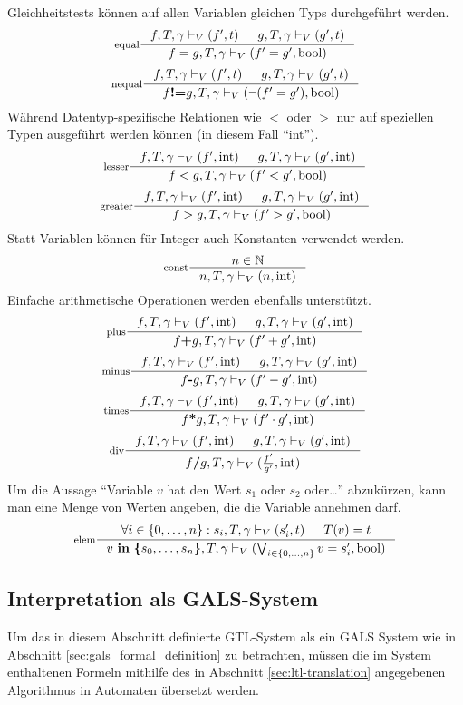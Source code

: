 Gleichheitstests können auf allen Variablen gleichen Typs durchgeführt werden.
\[
\inference[equal]{f,T,\gamma\vdash_V (f',t) & g,T,\gamma\vdash_V (g',t)}{f=g,T,\gamma\vdash_V(f'=g',\textrm{bool})}
\]
\[
\inference[nequal]{f,T,\gamma\vdash_V (f',t) & g,T,\gamma\vdash_V (g',t)}{f\textbf{!=}g,T,\gamma\vdash_V(\lnot(f'=g'),\textrm{bool})}
\]
Während Datentyp-spezifische Relationen wie $<$ oder $>$ nur auf speziellen Typen ausgeführt werden können (in diesem Fall "`int"').
\[
\inference[lesser]{f,T,\gamma\vdash_V (f',\textrm{int}) & g,T,\gamma\vdash_V (g',\textrm{int})}{f<g,T,\gamma\vdash_V(f'<g',\textrm{bool})}
\]
\[
\inference[greater]{f,T,\gamma\vdash_V (f',\textrm{int}) & g,T,\gamma\vdash_V (g',\textrm{int})}{f>g,T,\gamma\vdash_V(f'>g',\textrm{bool})}
\]
Statt Variablen können für Integer auch Konstanten verwendet werden. 
\[
\inference[const]{n\in\mathbb{N}}{n,T,\gamma\vdash_V (n,\textrm{int})}
\]
Einfache arithmetische Operationen werden ebenfalls unterstützt.
\[
\inference[plus]{f,T,\gamma\vdash_V (f',\textrm{int}) & g,T,\gamma\vdash_V (g',\textrm{int})}{f\textbf{+}g,T,\gamma\vdash_V (f'+g',\textrm{int})}
\]
\[
\inference[minus]{f,T,\gamma\vdash_V (f',\textrm{int}) & g,T,\gamma\vdash_V (g',\textrm{int})}{f\textbf{-}g,T,\gamma\vdash_V (f'-g',\textrm{int})}
\]
\[
\inference[times]{f,T,\gamma\vdash_V (f',\textrm{int}) & g,T,\gamma\vdash_V (g',\textrm{int})}{f\textbf{*}g,T,\gamma\vdash_V (f'\cdot g',\textrm{int})}
\]
\[
\inference[div]{f,T,\gamma\vdash_V (f',\textrm{int}) & g,T,\gamma\vdash_V (g',\textrm{int})}{f\textbf{/}g,T,\gamma\vdash_V (\frac{f'}{g'},\textrm{int})}
\]
Um die Aussage "`Variable $v$ hat den Wert $s_1$ oder $s_2$ oder\dots"' abzukürzen, kann man eine Menge von Werten angeben, die die Variable annehmen darf.
\[
\inference[elem]{\forall i\in\{0,\dots,n\}: s_i,T,\gamma\vdash_V (s_i',t) & T(v)=t}{v\ \textbf{in}\ \textbf{\{}s_0,\dots,s_n\textbf{\}},T,\gamma\vdash_V (\bigvee_{i\in\{0,\dots,n\}} v=s_i',\textrm{bool}) }
\]
\subsection{Interpretation als GALS-System}
Um das in diesem Abschnitt definierte GTL-System als ein GALS System wie in Abschnitt \ref{sec:gals_formal_definition} zu betrachten, müssen die im System enthaltenen Formeln mithilfe des in Abschnitt \ref{sec:ltl-translation} angegebenen Algorithmus in Automaten übersetzt werden.